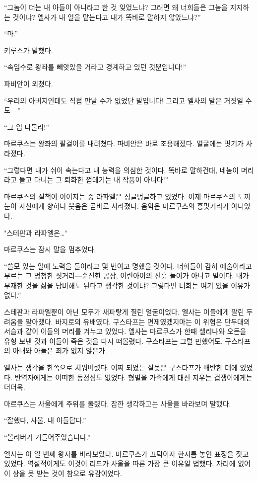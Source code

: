 ``그놈이 더는 내 아들이 아니라고 한 것 잊었느냐? 그러면 왜 너희들은 그놈을 지지하는 것이냐? 엘사가 내 일을 맡는다고 내가 똑바로 말하지 않았느냐?''

``마.''

키루스가 말했다.

``속임수로 왕좌를 빼앗았을 거라고 경계하고 있던 것뿐입니다!''

파비안이 외쳤다.

``우리의 아버지인데도 직접 만날 수가 없었단 말입니다! 그리고 엘사의 말은 거짓일 수도—''

``그 입 다물라!''

마르쿠스는 왕좌의 팔걸이를 내려쳤다. 파비안은 바로 조용해졌다. 얼굴에는 핏기가 사라졌다.

``그렇다면 내가 쉬이 속는다고 내 능력을 의심한 것이다. 똑바로 말하건대, 네놈이 머리라고 들고 다니는 그 퇴화한 껍데기는 내 작품이 아니다!''

마르쿠스의 질책이 이어지는 중 라파엘은 싱글벙글하고 있었다. 이제 마르쿠스의 도끼눈이 자신에게 향하니 웃음은 곧바로 사라졌다. 음악은 마르쿠스의 흥밋거리가 아니었다.

"스테판과 라파엘은\ldots"

마르쿠스는 잠시 말을 멈추었다.

``쓸모 있는 일에 노력을 들이라고 몇 번이고 명했을 것이다. 너희들이 감히 예술이라고 부르는 그 멍청한 짓거리—순진한 공상, 어린아이의 진흙 놀이가 아니고 말이다. 내가 부재한 것을 삶을 낭비해도 된다고 생각한 것이냐? 그렇다면 너희는 여기 있을 이유가 없다.''

스테판과 라파엘뿐이 아닌 모두가 새파랗게 질린 얼굴이었다. 엘사는 이들에게 깔린 두려움을 알아챘다. 바지로의 유배였다. 구스타프는 면제였겠지마는 이 위협은 단두대의 서슬과 같이 이들의 머리를 겨누고 있었다. 엘사는 마르쿠스가 한때 첼리나와 오든을 유형 보낸 것과 이들이 죽은 것을 다시 떠올렸다. 구스타프는 그럴 만했어도, 구스타프의 아내와 아들은 죄가 없지 않은가.

엘사는 생각을 한쪽으로 치워버렸다. 어찌 되었든 잘못은 구스타프가 배반한 데에 있었다. 반역자에게는 어떠한 동정심도 없었다. 형벌을 가족에게 대신 지우는 겁쟁이에게는 더더욱.

마르쿠스는 사울에게 주위를 돌렸다. 잠깐 생각하고는 사울을 바라보며 말했다.

``잘했다, 사울. 내 아들답다.''

``올리버가 거들어주었습니다.''

엘사는 이 열 번째 왕자를 바라보았다. 마르쿠스가 끄덕이자 한시름 놓인 표정을 짓고 있었다. 역설적이게도 이것이 리드가 사울을 따른 가장 큰 이유일 법했다. 자리에 없어 이 상을 못 받는 것이 참으로 유감이었다.

